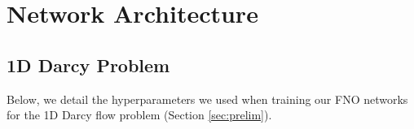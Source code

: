 
\chapter{Network Architecture}\label{app:B}
\section{1D Darcy Problem}
Below, we detail the hyperparameters we used when training our FNO networks for the 1D Darcy flow problem (Section \ref{sec:prelim}).